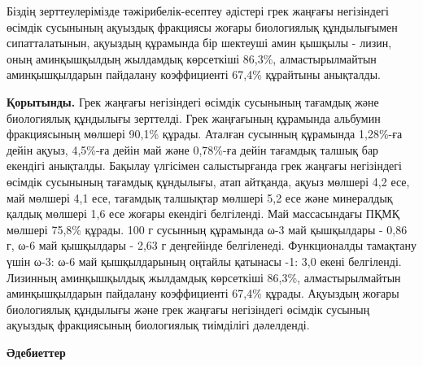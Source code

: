 \begin{multicols}{2}
Біздің зерттеулерімізде тәжірибелік-есептеу әдістері грек жаңғағы
негізіндегі өсімдік сусынының ақуыздық фракциясы жоғары биологиялық
құндылығымен сипатталатынын, ақуыздың құрамында бір шектеуші амин
қышқылы - лизин, оның аминқышқылдың жылдамдық көрсеткіші 86,3\%,
алмастырылмайтын аминқышқылдарын пайдалану коэффициенті 67,4\% құрайтыны
анықталды.

{\bfseries Қорытынды.} Грек жаңғағы негізіндегі өсімдік сусынының тағамдық
және биологиялық құндылығы зерттелді. Грек жаңғағының құрамында альбумин
фракциясының мөлшері 90,1\% құрады. Аталған сусынның құрамында 1,28\%-ға
дейін ақуыз, 4,5\%-ға дейін май және 0,78\%-ға дейін тағамдық талшық бар
екендігі анықталды. Бақылау үлгісімен салыстырғанда грек жаңғағы
негізіндегі өсімдік сусынының тағамдық құндылығы, атап айтқанда, ақуыз
мөлшері 4,2 есе, май мөлшері 4,1 есе, тағамдық талшықтар мөлшері 5,2 есе
және минералдық қалдық мөлшері 1,6 есе жоғары екендігі белгіленді. Май
массасындағы ПҚМҚ мөлшері 75,8\% құрады. 100 г сусынның құрамында ω-3
май қышқылдары - 0,86 г, ω-6 май қышқылдары - 2,63 г деңгейінде
белгіленеді. Функционалды тамақтану үшін ω-3: ω-6 май қышқылдарының
оңтайлы қатынасы -1: 3,0 екені белгіленді. Лизинның аминқышқылдық
жылдамдық көрсеткіші 86,3\%, алмастырылмайтын аминқышқылдарын пайдалану
коэффициенті 67,4\% құрады. Ақуыздың жоғары биологиялық құндылығы және
грек жаңғағы негізіндегі өсімдік сусының ақуыздық фракциясының
биологиялық тиімділігі дәлелденді.
\end{multicols}

\begin{center}
{\bfseries Әдебиеттер}
\end{center}

